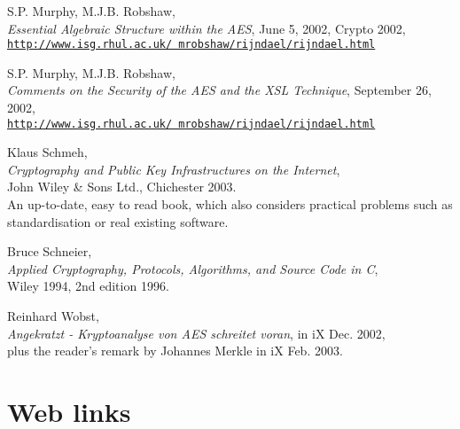 \begin{thebibliography}{99999}
  
        S.P. Murphy, M.J.B. Robshaw, \\
        {\em Essential Algebraic Structure within the AES}, 
        June 5, 2002, Crypto 2002,  \\
        \href{http://www.isg.rhul.ac.uk/\~{}mrobshaw/rijndael/rijndael.html}
        {\texttt{http://www.isg.rhul.ac.uk/~mrobshaw/rijndael/rijndael.html}}

  
        S.P. Murphy, M.J.B. Robshaw, \\
        {\em Comments on the Security of the AES and the XSL Technique}, 
        September 26, 2002, \\
        \href{http://www.isg.rhul.ac.uk/\~{}mrobshaw/rijndael/rijndael.html}
        {\texttt{http://www.isg.rhul.ac.uk/~mrobshaw/rijndael/rijndael.html}}

  
        Klaus Schmeh, \\
        {\em Cryptography and Public Key Infrastructures on the Internet},\\ 
        John Wiley \& Sons Ltd., Chichester 2003. \\
        An up-to-date, easy to read book, which also considers practical
        problems such as standardisation or real existing software.

  
    Bruce Schneier, \\
    {\em Applied Cryptography, Protocols, Algorithms, and Source Code in C}, \\
    Wiley 1994, 2nd edition 1996.

  
        Reinhard Wobst, \\
        {\em Angekratzt - Kryptoanalyse von AES schreitet voran}, 
        in iX Dec. 2002, \\
        plus the reader's remark by Johannes Merkle in iX Feb. 2003.

\end{thebibliography}


\newpage
\section*{Web links}

